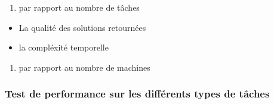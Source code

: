 \begin{enumerate}
\def\labelenumi{\arabic{enumi}.}
\itemsep1pt\parskip0pt
\item
  par rapport au nombre de tâches
\end{enumerate}

\begin{itemize}
\itemsep1pt\parskip0pt
\item
  La qualité des solutions retournées
\item
  la compléxité temporelle
\end{itemize}

\begin{enumerate}
\def\labelenumi{\arabic{enumi}.}
\setcounter{enumi}{1}
\itemsep1pt\parskip0pt
\item
  par rapport au nombre de machines
\end{enumerate}

\subsubsection{Test de performance sur les différents types de
tâches}\label{test-de-performance-sur-les-diffuxe9rents-types-de-tuxe2ches}

